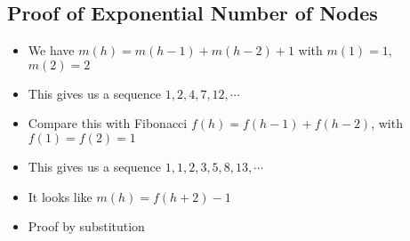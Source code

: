 
\begin{slide}
\section[-2]{Proof of Exponential Number of Nodes}

\begin{PauseHighLight}
  \begin{itemize}
  \item We have $m(h) = m(h-1) + m(h-2) + 1$ with $m(1)=1$, $m(2)=2$\pause
  \item This gives us a sequence $1, 2, 4, 7, 12, \cdots$\pause
  \item Compare this with Fibonacci $f(h)=f(h-1) + f(h-2)$, with
    $f(1)=f(2)=1$ \pause
  \item This gives us a sequence $1, 1, 2, 3 ,5, 8, 13, \cdots$\pause
  \item It looks like $m(h) = f(h+2) -1$\pause
  \item Proof by substitution\pause
  \end{itemize}
\end{PauseHighLight}

\end{slide}



